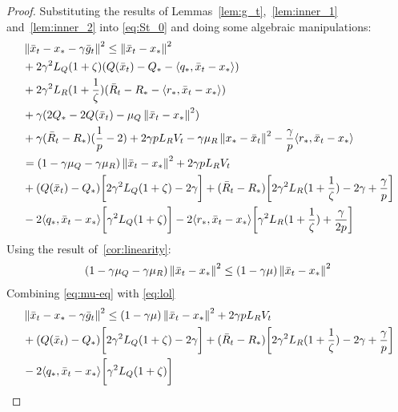 \begin{proof} Substituting the results of Lemmas~\ref{lem:g_t},~\ref{lem:inner_1} and~\ref{lem:inner_2} into \eqref{eq:St_0} and doing some algebraic manipulations:
    \begin{align}
        \begin{split}
            &\left\|\bar{x}_t - x_* - \gamma \bar{g}_t\right\|^2 \leq \left\|\bar{x}_t - x_*\right\|^2 \\
            &+ 2\gamma^2 L_Q (1 + \zeta) (Q(\bar{x}_t) - Q_* - \langle q_*, \bar{x}_t - x_*\rangle) \\
            &+ 2\gamma^2 L_R (1 + \frac{1}{\zeta}) (\bar{R}_t - R_* - \langle r_*, \bar{x}_t - x_*\rangle) \\
            &+ \gamma ( 2 Q_* - 2 Q(\bar{x}_t) - \mu_Q \left\|\bar{x}_t - x_*\right\|^2 ) \\
            &+ \gamma(\bar{R}_t - R_*)(\frac{1}{p} - 2) + 2 \gamma p L_R V_t - \gamma \mu_R \left\|x_* - \bar{x}_t\right\|^2 - \frac{\gamma}{p}\langle r_*, \bar{x}_t - x_*\rangle\\
            &= (1 - \gamma \mu_Q - \gamma \mu_R)\left\|\bar{x}_t - x_*\right\|^2 + 2 \gamma p L_R V_t \\
            &+ (Q(\bar{x}_t) - Q_*)\biggr[ 2\gamma^2 L_Q (1+\zeta) - 2\gamma \biggr]
            + (\bar{R}_t - R_*)\biggr[ 2\gamma^2 L_R (1+\frac{1}{\zeta}) - 2\gamma + \frac{\gamma}{p} \biggr] \\
            &- 2\langle q_*, \bar{x}_t - x_*\rangle\biggr[ \gamma^2 L_Q(1+\zeta) \biggr]
            - 2\langle r_*, \bar{x}_t - x_*\rangle\biggr[ \gamma^2 L_R(1+\frac{1}{\zeta}) + \frac{\gamma}{2p} \biggr] \label{eq:lol}
        \end{split}
    \end{align}
    Using the result of~\ref{cor:linearity}:
    \begin{align}
        (1 - \gamma \mu_Q - \gamma \mu_R)\left\|\bar{x}_t - x_*\right\|^2 \leq (1 - \gamma \mu)\left\|\bar{x}_t - x_*\right\|^2 \label{eq:mu-eq}
    \end{align}
    Combining \eqref{eq:mu-eq} with \eqref{eq:lol}
    \begin{align}
        \begin{split}
             &\norm{\bar{x}_t - x_* - \gamma \bar{g}_t}^2 \leq 
            (1 - \gamma \mu)\norm{\bar{x}_t - x_*}^2 + 2 \gamma p L_R V_t \\
            &+ (Q(\bar{x}_t) - Q_*)\coef {2\gamma^2 L_Q (1+\zeta) - 2\gamma}
            + (\bar{R}_t - R_*)\coef{2\gamma^2 L_R (1+\frac{1}{\zeta}) - 2\gamma + \frac{\gamma}{p}} \\
            &- 2\inner{q_*}{\bar{x}_t - x_*}\coef{\gamma^2 L_Q(1+\zeta)}

\end{split}
\end{align}
\end{proof}
